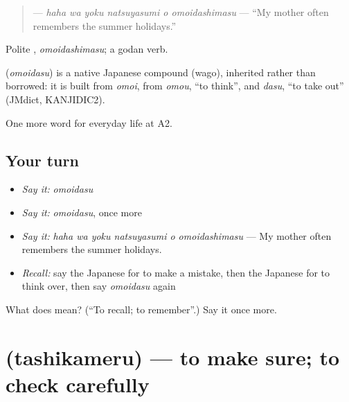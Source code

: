 \begin{quote}
\textbf{   } — \emph{haha wa yoku natsuyasumi o omoidashimasu} — \textquotedblleft{}My mother often remembers the summer holidays.\textquotedblright{}
\end{quote}

Polite \textbf{}, \emph{omoidashimasu}; a godan verb.

\begin{cousinweb}
\textbf{} (\emph{omoidasu}) is a native Japanese compound (wago), inherited rather than borrowed: it is built from \emph{omoi}, from \emph{omou}, \textquotedblleft{}to think\textquotedblright{}, and \emph{dasu}, \textquotedblleft{}to take out\textquotedblright{} (JMdict, KANJIDIC2).
\end{cousinweb}

\begin{grammarlens}[title={What you've built}]
One more word for everyday life at A2.
\end{grammarlens}

\subsection*{Your turn}
\begin{itemize}
\raggedright
  \item \emph{Say it:} \emph{omoidasu}
  \item \emph{Say it:} \emph{omoidasu}, once more
  \item \emph{Say it:} \emph{haha wa yoku natsuyasumi o omoidashimasu} — My mother often remembers the summer holidays.
  \item \emph{Recall:} say the Japanese for to make a mistake, then the Japanese for to think over, then say \emph{omoidasu} again
\end{itemize}

\begin{tcolorbox}[breakable,colback=teal!4,colframe=teal!35!black,title={Before you move on}]
What does  mean? (\textquotedblleft{}To recall; to remember\textquotedblright{}.) Say it once more.
\end{tcolorbox}
\section[\texorpdfstring{\ja{たしかめる} (tashikameru)}{たしかめる (tashikameru)}]{ (tashikameru) — to make sure; to check carefully}

